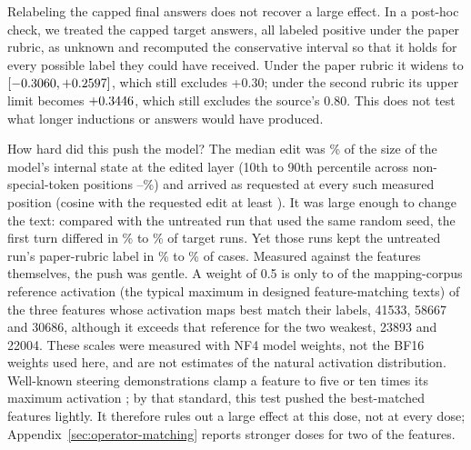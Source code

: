 Relabeling the capped final answers does not recover a large effect. In a
post-hoc check, we treated the
\SteeringTruncTargetCapped{} capped target answers, all labeled positive under
the paper rubric, as unknown and recomputed the conservative interval so that
it holds for every possible label they could have received. Under the paper
rubric it widens to $[-0.3060{},+0.2597{}]$,
which still excludes +0.30; under the second rubric its upper limit becomes
$+0.3446{}$, which still excludes the source's 0.80. This
does not test what longer inductions or answers would have produced.

How hard did this push the model? The median edit was
\SteeringDoseEditMedianPct\% of the size of the model's internal state at the
edited layer (10th to 90th percentile across non-special-token positions
\SteeringDoseEditLowPct--\SteeringDoseEditHighPct\%) and arrived as requested
at every such measured position (cosine with the requested edit at least
\SteeringDoseCosineMin). It was large enough to change the text: compared
with the untreated run that used the same random seed, the first turn
differed in \SteeringDoseTextChangedLow\% to \SteeringDoseTextChangedHigh\% of
target runs. Yet those runs kept the untreated run's paper-rubric label in
\SteeringDoseLabelSameLow\% to \SteeringDoseLabelSameHigh\% of cases. Measured
against the features themselves, the push was gentle. A weight of 0.5 is only
\SteeringDosePeakShareLow{} to \SteeringDosePeakShareHigh{} of the mapping-corpus
reference activation (the typical maximum in designed feature-matching texts) of
the three features whose activation maps best match their labels, 41533, 58667
and 30686, although it exceeds that reference for the two weakest, 23893 and
22004. These scales were measured with NF4 model weights, not the BF16 weights
used here, and are not estimates of the natural activation distribution.
Well-known steering demonstrations clamp a feature to five or ten times its
maximum activation \citep{templeton2024scaling}; by that standard, this test
pushed the best-matched features lightly. It therefore rules out a large
effect at this dose, not at every dose; Appendix~\ref{sec:operator-matching} reports stronger doses for two of
the features.

